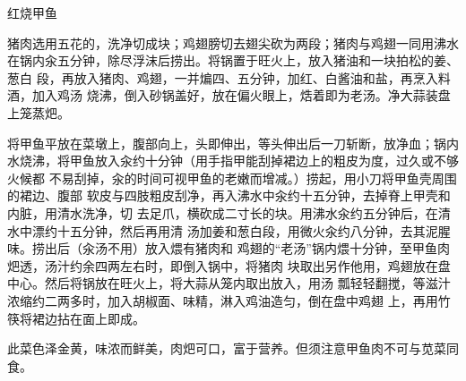\begin{recipe}{红烧甲鱼}

\ingredients


\preparation

\step 猪肉选用五花的，洗净切成块；鸡翅膀切去翅尖砍为两段；猪肉与鸡翅一同用沸水
在锅内汆五分钟，除尽浮沫后捞出。将锅置于旺火上，放入猪油和一块拍松的姜、葱白
段，再放入猪肉、鸡翅，一并煸四、五分钟，加红、白酱油和盐，再烹入料酒，加入鸡汤
烧沸，倒入砂锅盖好，放在偏火眼上，焅着即为老汤。净大蒜装盘上笼蒸𤆵。

\step 将甲鱼平放在菜墩上，腹部向上，头即伸出，等头伸出后一刀斩断，放净血；锅内
水烧沸，将甲鱼放入汆约十分钟（用手指甲能刮掉裙边上的粗皮为度，过久或不够火候都
不易刮掉，汆的时间可视甲鱼的老嫩而增减。）捞起，用小刀将甲鱼壳周围的裙边、腹部
软皮与四肢粗皮刮净，再入沸水中汆约十五分钟，去掉脊上甲壳和内脏，用清水洗净，切
去足爪，横砍成二寸长的块。用沸水汆约五分钟后，在清水中漂约十五分钟，然后再用清
汤加姜和葱白段，用微火汆约八分钟，去其泥腥味。捞出后（汆汤不用）放入煨有猪肉和
鸡翅的“老汤”锅内煨十分钟，至甲鱼肉𤆵透，汤汁约余四两左右时，即倒入锅中，将猪肉
块取出另作他用，鸡翅放在盘中心。然后将锅放在旺火上，将大蒜从笼内取出放入，用汤
瓢轻轻翻搅，等滋汁浓缩约二两多时，加入胡椒面、味精，淋入鸡油造匀，倒在盘中鸡翅
上，再用竹筷将裙边拈在面上即成。

\features

此菜色泽金黄，味浓而鲜美，肉𤆵可口，富于营养。但须注意甲鱼肉不可与苋菜同食。

\end{recipe}

